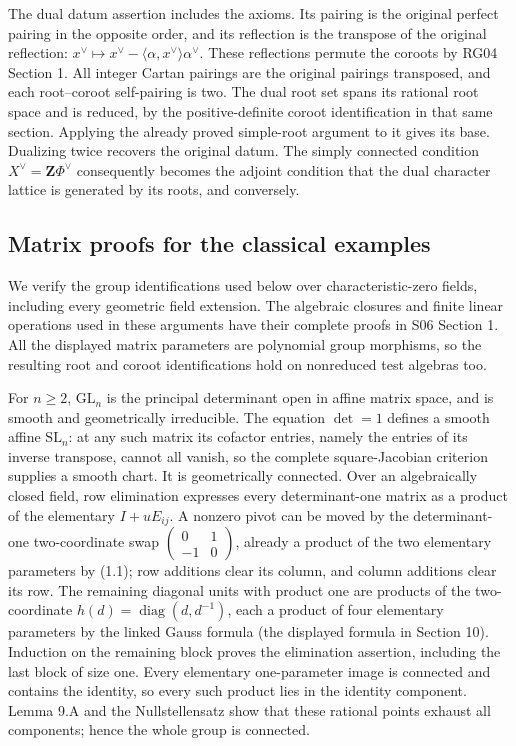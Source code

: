 \documentclass[11pt,a4paper,openany]{report}
\begin{document}
The dual datum assertion includes the axioms. Its pairing is the original perfect pairing in the opposite order, and its reflection is the transpose of the original reflection: \(x^\vee\mapsto x^\vee-\langle\alpha,x^\vee\rangle\alpha^\vee\). These reflections permute the coroots by RG04 Section 1. All integer Cartan pairings are the original pairings transposed, and each root--coroot self-pairing is two. The dual root set spans its rational root space and is reduced, by the positive-definite coroot identification in that same section. Applying the already proved simple-root argument to it gives its base. Dualizing twice recovers the original datum. The simply connected condition \(X^\vee=\mathbf Z\Phi^\vee\) consequently becomes the adjoint condition that the dual character lattice is generated by its roots, and conversely.

\subsection{Matrix proofs for the classical examples}\label{AG-RG-05-matrix-proofs-for-the-classical-examples}

We verify the group identifications used below over characteristic-zero fields, including every geometric field extension. The algebraic closures and finite linear operations used in these arguments have their complete proofs in S06 Section 1. All the displayed matrix parameters are polynomial group morphisms, so the resulting root and coroot identifications hold on nonreduced test algebras too.

For \(n\ge2\), \(\mathrm{GL}_n\) is the principal determinant open in affine matrix space, and is smooth and geometrically irreducible. The equation \(\det=1\) defines a smooth affine \(\mathrm{SL}_n\): at any such matrix its cofactor entries, namely the entries of its inverse transpose, cannot all vanish, so the complete square-Jacobian criterion supplies a smooth chart. It is geometrically connected. Over an algebraically closed field, row elimination expresses every determinant-one matrix as a product of the elementary \(I+uE_{ij}\). A nonzero pivot can be moved by the determinant-one two-coordinate swap \(\left(\begin{smallmatrix}0&1\\-1&0\end{smallmatrix}\right)\), already a product of the two elementary parameters by (1.1); row additions clear its column, and column additions clear its row. The remaining diagonal units with product one are products of the two-coordinate \(h(d)=\operatorname{diag}(d,d^{-1})\), each a product of four elementary parameters by the linked Gauss formula (the displayed formula in Section 10). Induction on the remaining block proves the elimination assertion, including the last block of size one. Every elementary one-parameter image is connected and contains the identity, so every such product lies in the identity component. Lemma 9.A and the Nullstellensatz show that these rational points exhaust all components; hence the whole group is connected.
\end{document}

